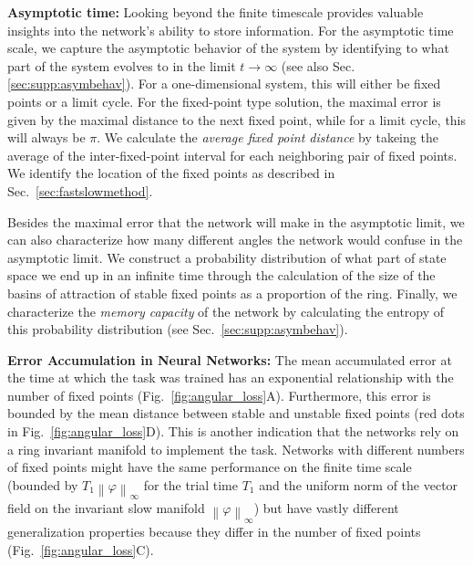 \documentclass{article} %
\newcommand{\ptitle}[1]{\textbf{#1:}\xspace}
\newcounter{ct}
\newcommand{\uniformNorm}[1]{\left\|#1\right\|_\infty} %
\theoremstyle{definition}
\theoremstyle{remark}
\begin{document}
\ptitle{Asymptotic time}
Looking beyond the finite timescale provides valuable insights into the network's ability to store information.
For the asymptotic time scale, we capture the asymptotic behavior of the system by identifying to what part of the system evolves to in the limit \(t\rightarrow\infty\) (see also Sec.\ref{sec:supp:asymbehav}).
For a one-dimensional system, this will either be fixed points or a limit cycle.
For the fixed-point type solution, the maximal error is given by the maximal distance to the next fixed point, while for a limit cycle, this will always be \(\pi\).
We calculate the \emph{average fixed point distance} by takeing the average of the inter-fixed-point interval for each neighboring pair of fixed points.
We identify the location of the fixed points as described in Sec.~\ref{sec:fastslowmethod}.

Besides the maximal error that the network will make in the asymptotic limit, we can also characterize how many different angles the network would confuse in the asymptotic limit.
We construct a probability distribution of what part of state space we end up in an infinite time through the calculation of the size of the basins of attraction of stable fixed points as a proportion of the ring.
Finally, we characterize the \emph{memory capacity} of the network by calculating the entropy of this probability distribution (see Sec.~\ref{sec:supp:asymbehav}).


\ptitle{Error Accumulation in Neural Networks}
The mean accumulated error at the time at which the task was trained has an exponential relationship with the number of fixed points (Fig.~\ref{fig:angular_loss}A).
Furthermore, this error is bounded by the mean distance between stable and unstable fixed points (red dots in Fig.~\ref{fig:angular_loss}D).
This is another indication that the networks rely on a ring invariant manifold to implement the task.
Networks with different numbers of fixed points might have the same performance on the finite time scale (bounded by \(T_{1}\uniformNorm{\varphi}\) for the trial time \(T_{1}\) and the uniform norm of the vector field on the invariant slow manifold \(\uniformNorm{\varphi}\)) but have vastly different generalization properties because they differ in the number of fixed points (Fig.~\ref{fig:angular_loss}C).
\end{document}
